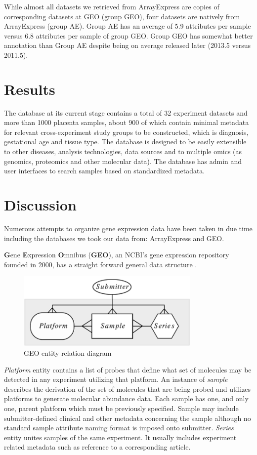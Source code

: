 \documentclass[conference]{IEEEtran}
\begin{document}
While almost all datasets we retrieved from ArrayExpress are copies of corresponding datasets at GEO (group GEO), four datasets are natively from ArrayExpress (group AE). Group AE has an average of 5.9 attributes per sample versus 6.8 attributes per sample of group GEO. Group GEO has somewhat better annotation than Group AE despite being on average released later (2013.5 versus 2011.5).

\section{Results}

The database at its current stage contains a total of 32 experiment datasets and more than 1000 placenta samples, about 900 of which contain minimal metadata for relevant cross-experiment study groups to be constructed, which is diagnosis, gestational age and tissue type. The database is designed to be easily extensible to other diseases, analysis technologies, data sources and to multiple omics (as genomics, proteomics and other molecular data). The database has admin and user interfaces to search samples based on standardized metadata.

\section{Discussion}

Numerous attempts to organize gene expression data have been taken in due time including the databases we took our data from: ArrayExpress and GEO.

\textbf{G}ene \textbf{E}xpression \textbf{O}mnibus (\textbf{GEO}), an NCBI's gene expression repository founded in 2000, has a straight forward general data structure \cite{Edgar2002GeneRepository}.

\begin{figure}[h]
        \includegraphics[width=3.5in]{plots/GeoDiagram}
        \caption{GEO entity relation diagram}
        \label{fig:GeoDiagram}
\end{figure}

\textit{Platform} entity contains a list of probes that define what set of molecules may be detected in any experiment utilizing that platform. An instance of \textit{sample} describes the derivation of the set of molecules that are being probed and utilizes platforms to generate molecular abundance data. Each sample has one, and only one, parent platform which must be previously specified. Sample may include submitter-defined clinical and other metadata concerning the sample although no standard sample attribute naming format is imposed onto submitter. \textit{Series} entity unites samples of the same experiment. It usually includes experiment related metadata such as reference to a corresponding article. 
\end{document}
